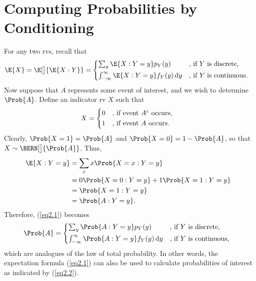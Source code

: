 \newpage
{}%
\section{Computing Probabilities by Conditioning}
\begin{Regular}
    For any two rvs, recall that
    \begin{equation}
        \E{X}=\E[\big]{\E{X\given Y}}=\begin{cases*}
            \sum_y\E{X\given Y=y}p_Y(y)                          & , if $ Y $ is discrete,   \\
            \int_{-\infty}^{\infty}\E{X\given Y=y}f_Y(y)\odif{y} & , if $ Y $ is continuous.
        \end{cases*}\label{eq2.1}
    \end{equation}
    Now suppose that $ A $ represents some event of interest, and we wish to determine $ \Prob{A} $.
    Define an indicator rv $ X $ such that
    \[ X=\begin{cases*}
            0 & , if event $ A^c $ occurs, \\
            1 & , if event $ A $ occurs.
        \end{cases*} \]
    Clearly, $ \Prob{X=1}=\Prob{A} $ and $ \Prob{X=0}=1-\Prob{A} $, so that $ X \sim \BERN[\big]{\Prob{A}} $. Thus,
    \begin{align*}
        \E{X\given Y=y}
         & =\sum_x x\Prob{X=x\given Y=y}                \\
         & =0\Prob{X=0\given Y=y}+1\Prob{X=1\given Y=y} \\
         & =\Prob{X=1\given Y=y}                        \\
         & =\Prob{A\given Y=y}.
    \end{align*}
    Therefore, (\ref{eq2.1}) becomes
    \begin{equation}
        \Prob{A}=\begin{cases*}
            \sum_y\Prob{A\given Y=y}p_Y(y)                          & , if $ Y $ is discrete,   \\
            \int_{-\infty}^{\infty}\Prob{A\given Y=y}f_Y(y)\odif{y} & , if $ Y $ is continuous,
        \end{cases*}\label{eq2.2}
    \end{equation}
    which are analogues of the law of total probability. In other words, the expectation formula (\ref{eq2.1})
    can also be used to calculate probabilities of interest as indicated by (\ref{eq2.2}).
\end{Regular}
